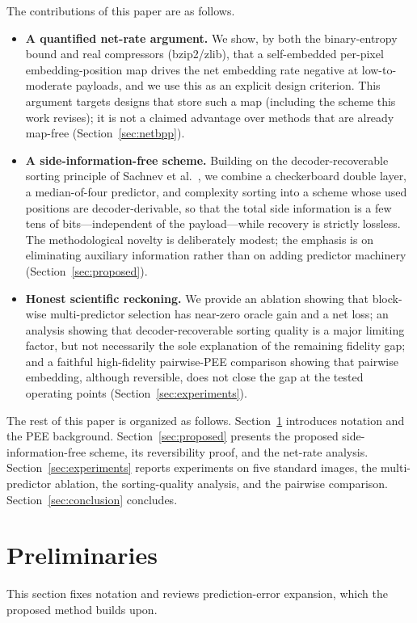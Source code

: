 \documentclass[journal,article,submit,pdftex,moreauthors]{Definitions/mdpi}
\begin{document}
The contributions of this paper are as follows.
\begin{itemize}
\item \textbf{A quantified net-rate argument.} We show, by both the binary-entropy bound and real compressors (bzip2/zlib), that a self-embedded per-pixel embedding-position map drives the net embedding rate negative at low-to-moderate payloads, and we use this as an explicit design criterion. This argument targets designs that store such a map (including the scheme this work revises); it is not a claimed advantage over methods that are already map-free (Section~\ref{sec:netbpp}).
\item \textbf{A side-information-free scheme.} Building on the decoder-recoverable sorting principle of Sachnev et al.~\cite{Sachnev2009}, we combine a checkerboard double layer, a median-of-four predictor, and complexity sorting into a scheme whose used positions are decoder-derivable, so that the total side information is a few tens of bits---independent of the payload---while recovery is strictly lossless. The methodological novelty is deliberately modest; the emphasis is on eliminating auxiliary information rather than on adding predictor machinery (Section~\ref{sec:proposed}).
\item \textbf{Honest scientific reckoning.} We provide an ablation showing that block-wise multi-predictor selection has near-zero oracle gain and a net loss; an analysis showing that decoder-recoverable sorting quality is a major limiting factor, but not necessarily the sole explanation of the remaining fidelity gap; and a faithful high-fidelity pairwise-PEE comparison showing that pairwise embedding, although reversible, does not close the gap at the tested operating points (Section~\ref{sec:experiments}).
\end{itemize}

The rest of this paper is organized as follows. Section~\ref{sec:pre} introduces notation and the PEE background. Section~\ref{sec:proposed} presents the proposed side-information-free scheme, its reversibility proof, and the net-rate analysis. Section~\ref{sec:experiments} reports experiments on five standard images, the multi-predictor ablation, the sorting-quality analysis, and the pairwise comparison. Section~\ref{sec:conclusion} concludes.

\section{Preliminaries}\label{sec:pre}
This section fixes notation and reviews prediction-error expansion, which the proposed method builds upon.
\end{document}
